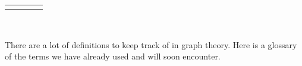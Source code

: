 \documentclass[12pt,]{book}
\theoremstyle{plain}
\theoremstyle{definition}
\theoremstyle{definition}
\theoremstyle{definition}
\numberwithin{equation}{chapter}
\newlength{\panelmax}
\begin{document}
\begin{assemblage}
{\begin{tabular}{@{}*{4}{c}@{}}
\begin{minipage}[c][\panelmax][b]{0.2\linewidth}\usebox{\panelboxBimage}\end{minipage}&
\begin{minipage}[c][\panelmax][b]{0.15\linewidth}\usebox{\panelboxCimage}\end{minipage}&
\begin{minipage}[c][\panelmax][b]{0.24\linewidth}\usebox{\panelboxDimage}\end{minipage}\end{tabular}\\
}%
\end{assemblage}
\hypertarget{p-1565}{}%
There are a lot of definitions to keep track of in graph theory.  Here is a glossary of the terms we have already used and will soon encounter.%
\end{document}
